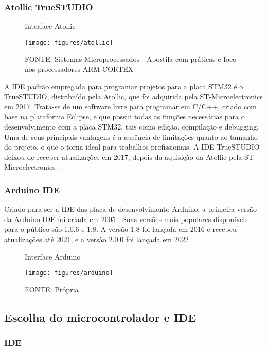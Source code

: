 \subsubsection{Atollic TrueSTUDIO}

\begin{figure}[ht]
	\centering
	\caption{Interface Atollic}
	\texttt{[image: figures/atollic]}
	\caption*{FONTE: Sistemas Microprocessados - Apostila com práticas e foco nos processadores ARM CORTEX \cite{apostila_microprossados}}
\end{figure}

A IDE padrão empregada para programar projetos para a placa STM32 é o TrueSTUDIO,
distribuído pela Atollic, que foi adquirida pela ST-Microelectronics em 2017.
Trata-se de um software livre para programar em C/C++, criado com base na
plataforma Eclipse, e que possui todas as funções necessárias para o
desenvolvimento com a placa STM32, tais como edição, compilação e debugging.
Uma de seus principais vantagens é a ausência de limitações quanto ao tamanho
do projeto, o que o torna ideal para trabalhos profissionais. A IDE TrueSTUDIO
deixou de receber atualizações em 2017, depois da aquisição da Atollic pela 
ST-Microelectronics \cite{apostila_microprossados}.


\subsubsection{Arduino IDE}

Criado para ser a IDE das placa de desenvolvimento Arduino, a primeira
versão da Arduino IDE foi criada em 2005 \cite{arduino_id_history}.
Suas versões mais populares disponíveis para o público são 1.0.6 e 1.8. 
A versão 1.8 foi lançada em 2016 e recebeu atualizações até 2021, 
e a versão 2.0.0 foi lançada em 2022 \cite{arduino_tag_2}.

\begin{figure}[ht]
	\centering
	\caption{Interface Arduino}
	\texttt{[image: figures/arduino]}
	\caption*{FONTE: Própria}
\end{figure}

\subsection{Escolha do microcontrolador e IDE}

\subsubsection{IDE}

